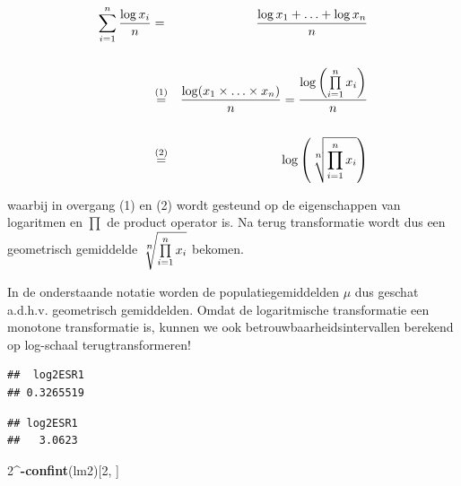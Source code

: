 \documentclass[
  12pt,dutch]{book}
\newenvironment{Shaded}{\begin{snugshade}}{\end{snugshade}}
\newcommand{\DecValTok}[1]{\textcolor[rgb]{0.00,0.00,0.81}{#1}}
\newcommand{\FunctionTok}[1]{\textcolor[rgb]{0.13,0.29,0.53}{\textbf{#1}}}
\newcommand{\NormalTok}[1]{#1}
\newcommand{\SpecialCharTok}[1]{\textcolor[rgb]{0.81,0.36,0.00}{\textbf{#1}}}
\theoremstyle{definition}
\theoremstyle{definition}
\theoremstyle{definition}
\theoremstyle{definition}
\theoremstyle{remark}
\begin{document}
\begin{eqnarray*}
\sum\limits_{i=1}^n \frac{\log x_i}{n}&=&\frac{\log x_1 + \ldots + \log x_n}{n}\\\\
&\stackrel{(1)}{=}&\frac{\log(x_1 \times \ldots \times x_n)}{n}=\frac{\log\left(\prod\limits_{i=1}^n x_i\right)}{n}\\\\
&\stackrel{(2)}{=}&\log \left(\sqrt[\leftroot{-1}\uproot{2}\scriptstyle n]{\prod\limits_{i=1}^n x_i}\right)
\end{eqnarray*}

waarbij in overgang (1) en (2) wordt gesteund op de eigenschappen van logaritmen en \(\prod\) de product operator is.
Na terug transformatie wordt dus een geometrisch gemiddelde \(\sqrt[\leftroot{-1}\uproot{2}\scriptstyle n]{\prod\limits_{i=1}^n x_i}\) bekomen.

In de onderstaande notatie worden de populatiegemiddelden \(\mu\) dus geschat a.d.h.v. geometrisch gemiddelden.
Omdat de logaritmische transformatie een monotone transformatie is, kunnen we ook betrouwbaarheidsintervallen berekend op log-schaal terugtransformeren!

\begin{Shaded}
\end{Shaded}

\begin{verbatim}
##  log2ESR1 
## 0.3265519
\end{verbatim}

\begin{Shaded}
\end{Shaded}

\begin{verbatim}
## log2ESR1 
##   3.0623
\end{verbatim}

\begin{Shaded}
\begin{Highlighting}[]
\DecValTok{2}\SpecialCharTok{\^{}{-}}\FunctionTok{confint}\NormalTok{(lm2)[}\DecValTok{2}\NormalTok{, ]}
\end{Highlighting}
\end{Shaded}
\end{document}
